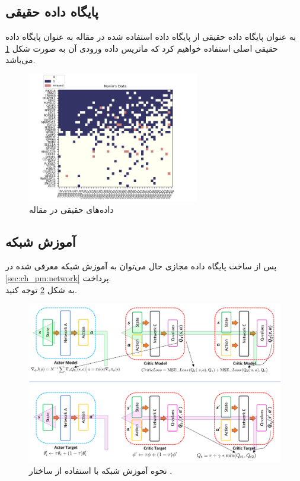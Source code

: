 \subsection[پایگاه داده حقیقی]
{پایگاه داده حقیقی
}
به عنوان پایگاه داده حقیقی از پایگاه داده استفاده شده در مقاله  به عنوان پایگاه داده حقیقی اصلی استفاده خواهیم کرد که ماتریس داده ورودی آن به صورت شکل  \ref{fig:navin_Dm} می‌باشد.
\begin{figure}[!ht]
	\centering 
	\includegraphics[width=0.67\textwidth]{img/dataset/r/Navin_Dm.png}
	\caption{داده‌های حقیقی  در مقاله }    
	\label{fig:navin_Dm}
\end{figure}


\subsection{آموزش شبکه }
پس از ساخت پایگاه داده مجازی حال می‌توان به آموزش شبکه معرفی شده در \ref{sec:ch_pm:network} پرداخت.
\\
به شکل \ref{fig:ch_er:td3} توجه کنید.
\begin{figure}[!ht]
	\centering 
	\includegraphics[width=\textwidth]{img/chaps/er/td3_crop}
	\caption{نحوه آموزش شبکه با استفاده از ساختار  \cite{fujimoto2018addressing}.}    
	\label{fig:ch_er:td3}
\end{figure} 

